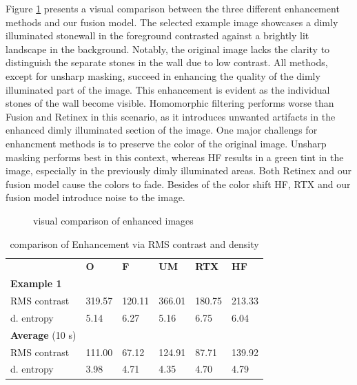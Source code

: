 \documentclass[sigconf]{acmart}
\begin{document}
Figure \ref{fig:visual_comparison_hike3} presents a visual comparison between the three different enhancement methods and our fusion model. The selected example image showcases a dimly illuminated stonewall in the foreground contrasted against a brightly lit landscape in the background. Notably, the original image lacks the clarity to distinguish the separate stones in the wall due to low contrast. All methods, except for unsharp masking, succeed in enhancing the quality of the dimly illuminated part of the image. This enhancement is evident as the individual stones of the wall become visible. Homomorphic filtering performs worse than Fusion and Retinex in this scenario, as it introduces unwanted artifacts in the enhanced dimly illuminated section of the image.
One major challengs for enhancment methods is to preserve the color of the original image. Unsharp masking performs best in this context, whereas HF results in a green tint in the image, especially in the previously dimly illuminated areas. Both Retinex and our fusion model cause the colors to fade. Besides of the color shift HF, RTX and our fusion model introduce noise to the image. 


\begin{figure}
    \qquad
    \qquad
	\qquad
    \caption{visual comparison of enhanced images}
    \label{fig:visual_comparison_hike3}
\end{figure}


\begin{table}[]
	\begin{tabular}{l|lllll}
	 	             & \textbf{O}      & \textbf{F}     & \textbf{UM }    & \textbf{RTX} & \textbf{HF} \\
	\textbf{Example 1}       &		  &                &       & \\
	RMS contrast     & 319.57 & 120.11 & 366.01 & 180.75 & 213.33 \\
	d. entropy       & 5.14   & 6.27 & 5.16   & 6.75  & 6.04\\		 
    \hline
	\textbf{Average} (10 s)   &		  &                &       & \\
	RMS contrast     & 111.00 & 67.12 & 124.91 & 87.71 & 139.92 \\
	d. entropy       & 3.98   & 4.71  & 4.35   & 4.70  & 4.79\\
	 
	\end{tabular}
	\caption{comparison of Enhancement via RMS contrast and density}
	\label{tab:image_enhancement_measure}
\end{table}
\end{document}
